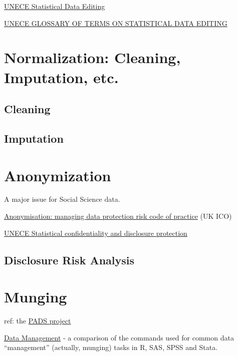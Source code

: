 \documentclass[reqno,12pt]{tufte-book}
\numberwithin{equation}{subsection}
\begin{document}
\href{http://www.unece.org/stats/editing.html}{UNECE Statistical Data Editing}

\href{http://www.unece.org/fileadmin/DAM/stats/publications/editingglossary.pdf}{UNECE GLOSSARY OF TERMS ON STATISTICAL DATA EDITING}

\chapter{Normalization: Cleaning, Imputation, etc.}

\section{Cleaning}

\section{Imputation}


\chapter{Anonymization}

A major issue for Social Science data.

\href{http://ico.org.uk/for\_organisations/data\_protection/topic\_guides/anonymisation}{Anonymisation:
  managing data protection risk code of practice} (UK ICO)

\href{http://www.unece.org/stats/confidentiality.html}{UNECE Statistical confidentiality and disclosure protection}

\section{Disclosure Risk Analysis}

\chapter{Munging}

ref:  the \href{http://www.padsproj.org/index.html}{PADS project}

\href{http://r4stats.com/examples/data-management/}{Data Management} - a comparison of the commands used for common data ``management'' (actually, munging) tasks in R, SAS, SPSS and Stata.
\end{document}
